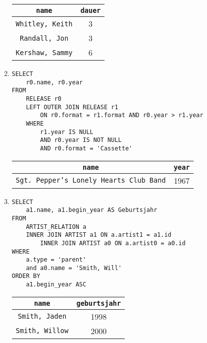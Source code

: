 \documentclass{article}
\begin{document}
\begin{enumerate}
            \begin{tabular}{|c|c|}
                \texttt{name} & \texttt{dauer} \\
                \toprule
                \texttt{Whitley, Keith} & 3 \\
                \texttt{Randall, Jon} & 3 \\
                \texttt{Kershaw, Sammy} & 6 \\
            \end{tabular}
        \item
            \begin{verbatim}
SELECT
    r0.name, r0.year
FROM
    RELEASE r0
    LEFT OUTER JOIN RELEASE r1
        ON r0.format = r1.format AND r0.year > r1.year
    WHERE
        r1.year IS NULL
        AND r0.year IS NOT NULL
        AND r0.format = 'Cassette'
            \end{verbatim}
            \begin{tabular}{|c|c|}
                \texttt{name} & \texttt{year} \\
                \toprule
                \texttt{Sgt. Pepper’s Lonely Hearts Club Band} & 1967 \\
            \end{tabular}
        \item
            \begin{verbatim}
SELECT
    a1.name, a1.begin_year AS Geburtsjahr
FROM
    ARTIST_RELATION a
    INNER JOIN ARTIST a1 ON a.artist1 = a1.id
        INNER JOIN ARTIST a0 ON a.artist0 = a0.id
WHERE
    a.type = 'parent'
    and a0.name = 'Smith, Will'
ORDER BY
    a1.begin_year ASC
            \end{verbatim}
            \begin{tabular}{|c|c|}
                \texttt{name} & \texttt{geburtsjahr} \\
                \toprule
                \texttt{Smith, Jaden} & 1998 \\
                \texttt{Smith, Willow} & 2000 \\
            \end{tabular}
    \end{enumerate}
\end{document}

